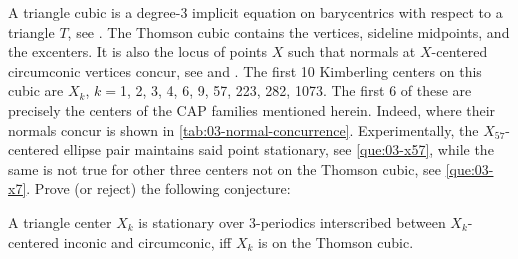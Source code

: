 \begin{question}
\label{que:03-thomson}
A triangle cubic is a degree-3 implicit equation on barycentrics with respect to a triangle $T$, see \cite[Triangle cubic]{mw}. The Thomson cubic contains the vertices, sideline midpoints, and the excenters. It is also the locus of points $X$ such that normals at $X$-centered circumconic vertices concur, see \cite{gibert2021-thomson} and \cite[Thomson cubic]{mw}. The first 10 Kimberling centers on this cubic are $X_k$, $k=$1, 2, 3, 4, 6, 9, 57, 223, 282, 1073. The first 6 of these are precisely the centers of the CAP families mentioned herein. Indeed, where their normals concur is shown in \cref{tab:03-normal-concurrence}. Experimentally, the $X_{57}$-centered ellipse pair maintains said point stationary, see \cref{que:03-x57}, while the same is not true for other three centers not on the Thomson cubic, see \cref{que:03-x7}. Prove (or reject) the following conjecture:
\end{question}

\begin{conjecture}
A triangle center $X_k$ is stationary over 3-periodics interscribed between $X_k$-centered inconic and circumconic, iff $X_k$ is on the Thomson cubic.
\end{conjecture}